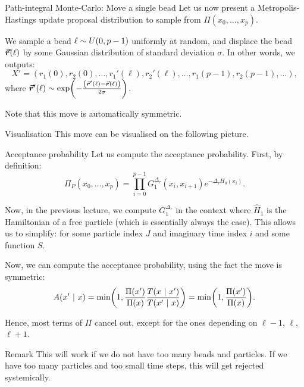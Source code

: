 \documentclass[a4paper]{article}
\begin{document}
\begin{parag}{Path-integral Monte-Carlo: Move a single bead}
    Let us now present a Metropolis-Hastings update proposal distribution to sample from $\Pi\left(x_0, \ldots, x_p\right)$.

    We sample a bead $\ell \followsdistr U\left(0, p-1\right)$ uniformly at random, and displace the bead $\bvec{r}\left(\ell\right)$ by some Gaussian distribution of standard deviation $\sigma$. In other words, we outputs: 
    \[X' = \left(r_1\left(0\right), r_2\left(0\right), \ldots, r_1'\left(\ell\right), r_2'\left(\ell\right), \ldots, r_1\left(p-1\right), r_2\left(p-1\right), \ldots\right),\]
    where $\bvec{r}'\left(\ell\right) \followsdistr \exp\left(-\frac{\left(\bvec{r}'\left(\ell\right) - \bvec{r}\left(\ell\right)\right)}{2 \sigma}\right)$.

    Note that this move is automatically symmetric.

    \begin{subparag}{Visualisation}
        This move can be visualised on the following picture.
    \end{subparag}

    \begin{subparag}{Acceptance probability}
        Let us compute the acceptance probability. First, by definition:
        \[\Pi_P\left(x_0, \ldots, x_p\right) = \prod_{i=0}^{p-1} G_1^{\Delta_{\tau}}\left(x_i, x_{i+1}\right) e^{-\Delta_{\tau}H_0\left(x_i\right)}.\]

        Now, in the previous lecture, we compute $G_1^{\Delta_{\tau}}$ in the context where $\hat{H}_1$ is the Hamiltonian of a free particle (which is essentially always the case). This allows us to simplify:
        for some particle index $J$ and imaginary time index $i$ and some function $S$.
        
        Now, we can compute the acceptance probability, using the fact the move is symmetric: 
        \[A\left(x' \suchthat x\right) = \min\left(1, \frac{\Pi\left(x'\right)}{\Pi\left(x\right)} \frac{T\left(x \suchthat x'\right)}{T\left(x' \suchthat x\right)}\right) = \min\left(1, \frac{\Pi\left(x'\right)}{\Pi\left(x\right)}\right).\]

        Hence, most terms of $\Pi$ cancel out, except for the ones depending on $\ell-1$, $\ell$, $\ell+1$.
    \end{subparag}

    \begin{subparag}{Remark}
        This will work if we do not have too many beads and particles. If we have too many particles and too small time steps, this will get rejected systemically. 
    \end{subparag}
\end{parag}
\end{document}
